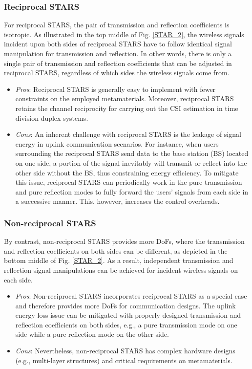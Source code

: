 \documentclass[journal]{IEEEtran}
\theoremstyle{definition}
\begin{document}
\subsubsection{Reciprocal STARS} For reciprocal STARS, the pair of transmission and reflection coefficients is isotropic. As illustrated in the top middle of Fig. \ref{STAR_2}, the wireless signals incident upon both sides of reciprocal STARS have to follow identical signal manipulation for transmission and reflection. In other words, there is only a single pair of transmission and reflection coefficients that can be adjusted in reciprocal STARS, regardless of which sides the wireless signals come from.  
\begin{itemize}	
	\item \emph{Pros}: Reciprocal STARS is generally easy to implement with fewer constraints on the employed metamaterials. Moreover, reciprocal STARS retains the channel reciprocity for carrying out the CSI estimation in time division duplex systems. 
    \item \emph{Cons}: An inherent challenge with reciprocal STARS is the leakage of signal energy in uplink communication scenarios. For instance, when users surrounding the reciprocal STARS send data to the base station (BS) located on one side, a portion of the signal inevitably will transmit or reflect into the other side without the BS, thus constraining energy efficiency. To mitigate this issue, reciprocal STARS can periodically work in the pure transmission and pure reflection modes to fully forward the users' signals from each side in a successive manner. This, however, increases the control overheads.
\end{itemize}

\subsubsection{Non-reciprocal STARS} By contrast, non-reciprocal STARS provides more DoFs, where the transmission and reflection coefficients on both sides can be different, as depicted in the bottom middle of Fig. \ref{STAR_2}. As a result, independent transmission and reflection signal manipulations can be achieved for incident wireless signals on each side.
\begin{itemize}	
	\item \emph{Pros}: Non-reciprocal STARS incorporates reciprocal STARS as a special case and therefore provides more DoFs for communication designs. The uplink energy loss issue can be mitigated with properly designed transmission and reflection coefficients on both sides, e.g., a pure transmission mode on one side while a pure reflection mode on the other side.
    \item \emph{Cons}: Nevertheless, non-reciprocal STARS has complex hardware designs (e.g., multi-layer structures) and critical requirements on metamaterials. 
\end{itemize}
\end{document}
